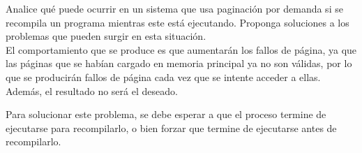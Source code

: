 \begin{ejercicio}
    Analice qué puede ocurrir en un sistema que usa paginación por demanda si se recompila un programa mientras este está ejecutando.
    Proponga soluciones a los problemas que pueden surgir en esta situación.\\

    El comportamiento que se produce es que aumentarán los fallos de página, ya que las páginas que se habían cargado en memoria principal
    ya no son válidas, por lo que se producirán fallos de página cada vez que se intente acceder a ellas. Además, el resultado no será el deseado.

    Para solucionar este problema, se debe esperar a que el proceso termine de ejecutarse para recompilarlo, o bien forzar que termine de ejecutarse antes de recompilarlo.
\end{ejercicio}

